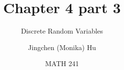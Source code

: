 \documentclass[slidestop,compress,mathserif]{beamer}
\title[Chapter 4 part 3]{Chapter 4 part 3}
\subtitle{Discrete Random Variables}
\author[Jingchen (Monika) Hu] %
{Jingchen (Monika) Hu}
\institute[Vassar] %
{Vassar College}
\date[MATH 241] %
{MATH 241}
\begin{document}


\begin{frame}%
\titlepage
\end{frame}

%
%
%
%
%
%





\end{document}
